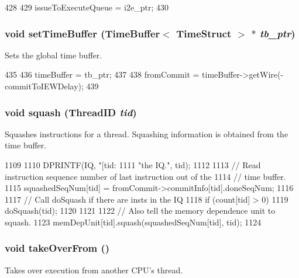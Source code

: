 \begin{DoxyCode}
428 {
429       issueToExecuteQueue = i2e_ptr;
430 }
\end{DoxyCode}
\hypertarget{classInstructionQueue_a2b521ea5f191fff72265f60d4ed5187b}{
\subsubsection[{setTimeBuffer}]{\setlength{\rightskip}{0pt plus 5cm}void setTimeBuffer ({\bf TimeBuffer}$<$ {\bf TimeStruct} $>$ $\ast$ {\em tb\_\-ptr})}}
\label{classInstructionQueue_a2b521ea5f191fff72265f60d4ed5187b}
Sets the global time buffer. 


\begin{DoxyCode}
435 {
436     timeBuffer = tb_ptr;
437 
438     fromCommit = timeBuffer->getWire(-commitToIEWDelay);
439 }
\end{DoxyCode}
\hypertarget{classInstructionQueue_ad33d65c18c323d90695d7c2355b49af9}{
\subsubsection[{squash}]{\setlength{\rightskip}{0pt plus 5cm}void squash ({\bf ThreadID} {\em tid})}}
\label{classInstructionQueue_ad33d65c18c323d90695d7c2355b49af9}
Squashes instructions for a thread. Squashing information is obtained from the time buffer. 


\begin{DoxyCode}
1109 {
1110     DPRINTF(IQ, "[tid:%
1111             "the IQ.\n", tid);
1112 
1113     // Read instruction sequence number of last instruction out of the
1114     // time buffer.
1115     squashedSeqNum[tid] = fromCommit->commitInfo[tid].doneSeqNum;
1116 
1117     // Call doSquash if there are insts in the IQ
1118     if (count[tid] > 0) {
1119         doSquash(tid);
1120     }
1121 
1122     // Also tell the memory dependence unit to squash.
1123     memDepUnit[tid].squash(squashedSeqNum[tid], tid);
1124 }
\end{DoxyCode}
\hypertarget{classInstructionQueue_a8674059ce345e23aac5086b2c3e24a43}{
\subsubsection[{takeOverFrom}]{\setlength{\rightskip}{0pt plus 5cm}void takeOverFrom ()}}
\label{classInstructionQueue_a8674059ce345e23aac5086b2c3e24a43}
Takes over execution from another CPU's thread. 


